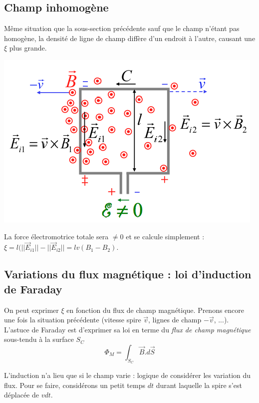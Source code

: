 \documentclass	[11pt, a4paper, openany]{book}
\begin{document}
\subsection{Champ inhomogène}
Même situation que la sous-section précédente sauf que le champ n'étant pas homogène, la densité de ligne de champ diffère d'un endroit à l'autre, causant une $\xi$ plus grande.
\begin{center}
\includegraphics[scale=0.45]{em/image9.png}\\
\end{center}
La force électromotrice totale sera $\neq 0$ et se calcule simplement : $\xi = l(||\vec{E}_{i1}|| - ||\vec{E}_{i2}|| = lv(B_1 - B_2)$.\\

\subsection{Variations du flux magnétique : loi d'induction de Faraday}
On peut exprimer $\xi$ en fonction du flux de champ magnétique. Prenons encore une fois la situation précédente (vitesse spire $\vec{v}$, lignes de champ $-\vec{v}$, ...).\\
L'astuce de Faraday est d'exprimer sa loi en terme du \textit{flux de champ magnétique} sous-tendu à la surface $S_C$
\begin{equation}
\Phi_M = \int_{S_C} \vec{B}.d\vec{S}
\end{equation}

L'induction n'a lieu que si le champ varie : logique de considérer les variation du flux. Pour se faire, considérons un petit temps $dt$ durant laquelle la spire s'est déplacée de $vdt$.
\end{document}
